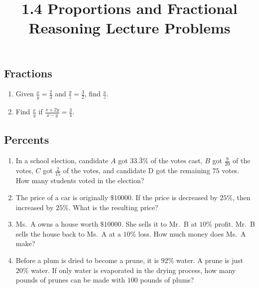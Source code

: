 \documentclass{article}
\title{1.4 Proportions and Fractional Reasoning Lecture Problems}
\author{}
\date{}
\begin{document}
\maketitle

\subsection*{Fractions}
    \begin{enumerate}
        \item Given $\frac{x}{y} = \frac{2}{3}$ and $\frac{y}{z} = \frac{3}{2}$, find $\frac{x}{z}$.
            \vspace{3cm}
        \item Find $\frac{x}{y}$ if $\frac{x + 2y}{x - y} = \frac{3}{4}$.
            \vspace{3cm}
    \end{enumerate}

\subsection*{Percents}
    \begin{enumerate}[resume]
        \item In a school election, candidate $A$ got $33.\bar{3}\%$ of the votes cast, $B$ got $\frac{9}{20}$ of the votes, $C$ got $\frac{2}{15}$ of the votes, and candidate D got the remaining $75$ votes.
            How many students voted in the election?
            \vspace{3cm}
        \item The price of a car is originally $\$\num{10000}$.
            If the price is decreased by $25\%$, then increased by $25\%$.
            What is the resulting price?
            \vspace{3cm}
        \item Ms.\ A owns a house worth $\$\num{10000}$.
            She sells it to Mr.\ B at $10\%$ profit.
            Mr.\ B sells the house back to Ms.\ A at a $10\%$ loss.
            How much money does Ms.\ A make?
            \vspace{3cm}
        \item Before a plum is dried to become a prune, it is $92\%$ water.
            A prune is just $20\%$ water.
            If only water is evaporated in the drying process, how many pounds of prunes can be made with $100$ pounds of plums?
            \vspace{3cm}
    \end{enumerate}
\end{document}
